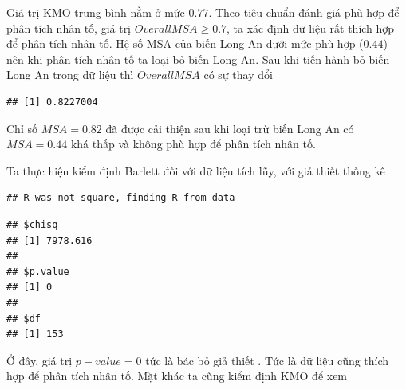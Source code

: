 \documentclass[../thesis.tex]{subfiles}
\begin{document}
Giá trị KMO trung bình nằm ở mức $ 0.77 $. Theo tiêu chuẩn đánh giá phù hợp để phân tích nhân tố, giá trị $ Overall MSA \geq 0.7 $, ta xác định dữ liệu rất thích hợp để phân tích nhân tố. Hệ số MSA của biến Long An dưới mức phù hợp ($ 0.44 $) nên khi phân tích nhân tố ta loại bỏ biến Long An. Sau khi tiến hành bỏ biến Long An trong dữ liệu thì $ Overall MSA $ có sự thay đổi

\begin{Shaded}
	\begin{Highlighting}[]
\SpecialCharTok{\%\textgreater{}\%} \SpecialCharTok{{-}}\SpecialCharTok{\%\textgreater{}\%} 
\NormalTok{() }\SpecialCharTok{\%\textgreater{}\%}\SpecialCharTok{\$}
	\end{Highlighting}
\end{Shaded}

\begin{verbatim}
## [1] 0.8227004
\end{verbatim}

Chỉ số $ MSA = 0.82 $ đã được cải thiện sau khi loại trừ biến Long An có $ MSA = 0.44 $ khá thấp và không phù hợp để phân tích nhân tố.


\newpage
Ta thực hiện kiểm định Barlett đối với dữ liệu tích lũy, với giả thiết thống kê 
\begin{Shaded}
	\begin{Highlighting}[]
\SpecialCharTok{\%\textgreater{}\%}\SpecialCharTok{::}\NormalTok{()}
	\end{Highlighting}
\end{Shaded}

\begin{verbatim}
## R was not square, finding R from data
\end{verbatim}

\begin{verbatim}
## $chisq
## [1] 7978.616
## 
## $p.value
## [1] 0
## 
## $df
## [1] 153
\end{verbatim}

Ở đây, giá trị $ p-value = 0 $ tức là bác bỏ giả thiết . Tức là dữ liệu cũng thích hợp để phân tích nhân tố. Mặt khác ta cũng kiểm định KMO để xem

\begin{Shaded}
	\begin{Highlighting}[]
\SpecialCharTok{\%\textgreater{}\%}\SpecialCharTok{::}\NormalTok{()}
	\end{Highlighting}
\end{Shaded}
\end{document}
